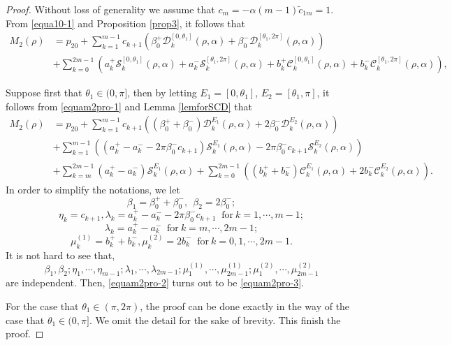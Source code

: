 \documentclass[11pt]{amsart}
\theoremstyle{remark}
\theoremstyle{definition}
\begin{document}
\begin{proof} Without loss of generality we assume that $c_m=-\alpha(m-1)\tilde{c}_{1m}=1$.     From \eqref{equa10-1} and Proposition \ref{prop3}, it follows that
  \begin{equation} \label{equam2pro-1}
\begin{split}
M_2(\rho)&=p_{20}+\sum_{k=1}^{m-1}c_{k+1}\left(\beta_0^{+}\mathcal{D}_{k}^{[0,\theta_1]}(\rho,\alpha)+\beta_0^{-}\mathcal{D}_{k}^{[\theta_1,2\pi]}(\rho,\alpha)\right)\\
&+\sum_{k=0}^{2m-1}\left(a_{k}^{+}\mathcal{S}_{k}^{[0,\theta_1]}(\rho,\alpha)+a_{k}^{-}\mathcal{S}_{k}^{[\theta_1,2\pi]}(\rho,\alpha)+b_{k}^{+}\mathcal{C}_{k}^{[0,\theta_1]}(\rho,\alpha)+b_{k}^{-}\mathcal{C}_{k}^{[\theta_1,2\pi]}(\rho,\alpha)\right),
\end{split}\end{equation}

Suppose first that  $\theta_1\in (0,\pi]$, then by letting   $E_1=[0,\theta_1]$, $E_2=[\theta_1, \pi]$, it follows from \eqref{equam2pro-1} and Lemma \ref{lemforSCD} that
 \begin{equation} \label{equam2pro-2}
\begin{split}
M_2(\rho)&=p_{20}+\sum_{k=1}^{m-1}c_{k+1}\left((\beta_0^{+}+\beta_0^{-})\mathcal{D}_{k}^{E_1}(\rho,\alpha)+2\beta_0^{-}\mathcal{D}_{k}^{E_2}(\rho,\alpha)\right)\\
&+\sum_{k=1}^{m-1}\left((a_{k}^{+}-a_{k}^{-}-2\pi\beta_0^{-}c_{k+1})\mathcal{S}_{k}^{E_1}(\rho,\alpha)-2\pi\beta_0^{-}c_{k+1}\mathcal{S}_{k}^{E_2}(\rho,\alpha)\right)\\
&+\sum_{k=m}^{2m-1}(a_{k}^{+}-a_{k}^{-})\mathcal{S}_{k}^{E_1}(\rho,\alpha)
+\sum_{k=0}^{2m-1}\left((b_{k}^{+}+b_{k}^{-})\mathcal{C}_{k}^{E_1}(\rho,\alpha)+2b_{k}^{-}\mathcal{C}_{k}^{E_2}(\rho,\alpha)\right).
\end{split}\end{equation}
In order to simplify the notations, we let $$\beta_1=\beta_0^{+}+\beta_0^{-}, \ \ \beta_2=2\beta_0^{-};$$  $$\eta_k={c_{k+1}}, \lambda_k=a_{k}^{+}-a_{k}^{-}-2\pi\beta_0^{-}c_{k+1} \ \mbox{ for}\ k=1, \cdots, m-1;$$
$$\lambda_k=a_{k}^{+}-a_{k}^{-} \ \mbox{ for}\ k=m, \cdots, 2m-1;$$
 $$\mu_k^{(1)}=b_{k}^{+}+b_{k}^{-},   \mu_k^{(2)}=2b_{k}^{-}  \ \mbox{ for}\  k=0, 1, \cdots, 2m-1. $$
 It is not hard to see that,
$$\beta_1, \beta_2; \eta_1,\cdots,\eta_{m-1};\lambda_1, \cdots,\lambda_{2m-1}; \mu_1^{(1)}, \cdots,\mu_{2m-1}^{(1)};  \mu_1^{(2)}, \cdots,\mu_{2m-1}^{(2)}$$
are independent.
Then, \eqref{equam2pro-2} turns out to be   \eqref{equam2pro-3}.





For the case that $\theta_1\in (\pi, 2\pi)$, the proof can be done exactly in the way of the case that $\theta_1\in (0,\pi]$. We omit the detail for the sake of brevity. This finish the proof.
\end{proof}
\end{document}
